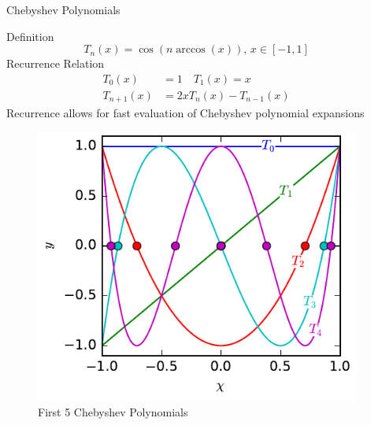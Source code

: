 \documentclass[final]{beamer}
\begin{document}
\begin{frame}[fragile]{}
\begin{columns}[t]
\begin{column}{.31\linewidth}
\begin{block}{Chebyshev Polynomials}
\begin{minipage}{.5\textwidth}
{\color{numhypRed} Definition}
$$T_n(x)=\cos\left(n\arccos(x)\right),\, x\in[-1,1]$$
{\color{numhypRed} Recurrence Relation}
\begin{align*}
T_0(x) &= 1\quad T_1(x) = x\\
T_{n+1}(x) &= 2xT_n(x)-T_{n-1}(x)
\end{align*}
Recurrence allows for fast evaluation of Chebyshev polynomial expansions
\end{minipage}
\begin{minipage}{.45\textwidth}
\begin{center}
\begin{figure}
\includegraphics[width=.8\textwidth]{cheb_poly_plot.pdf}
\caption{First 5 Chebyshev Polynomials}
\end{figure}
\end{center}
\end{minipage}
\end{block}


\end{column}

    \begin{column}{.31\linewidth}

%


\end{column}
\end{columns}
\end{frame}
\end{document}
